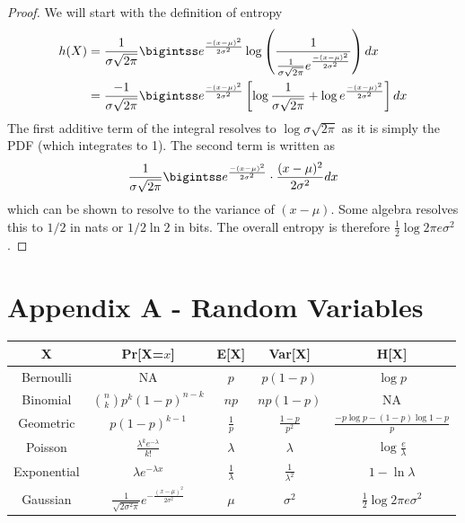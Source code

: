 \documentclass[11pt]{article}
\theoremstyle{definition}
\begin{document}
\begin{proof}
We will start with the definition of entropy 
\begin{align*}
h(X) &= \frac{1}{\sigma \sqrt{2\pi}} \bigintss e^{\frac{-(x - \mu)^2}{2 \sigma^2}} \log \left( \frac{1}{\frac{1}{\sigma \sqrt{2 \pi}} e^{\frac{-(x - \mu)^2}{2 \sigma^2}}} \right) dx \\
 &=   \frac{-1}{\sigma \sqrt{2\pi}} \bigintss e^{\frac{-(x - \mu)^2}{2 \sigma^2}} \left[ \log \frac{1}{\sigma \sqrt{2\pi}} + \log e^{\frac{-(x - \mu)^2}{2 \sigma^2}} \right] dx
\end{align*}
The first additive term of the integral resolves to $\log \sigma \sqrt{2\pi}$ as it is simply the PDF (which integrates to 1). The second term is written as
\begin{align*}
\frac{1}{\sigma \sqrt{2\pi}} \bigintss e^{\frac{-(x - \mu)^2}{2 \sigma^2}} \cdot \frac{(x-\mu)^2}{2\sigma^2} dx
\end{align*}
which can be shown to resolve to the variance of $(x-\mu)$. Some algebra resolves this to $1/2$ in nats or $1/2\ln 2$ in bits. The overall entropy is therefore $\frac{1}{2} \log 2 \pi e \sigma^2$. 
\end{proof}

\newpage
\section*{Appendix A - Random Variables}
\begin{table}[h]
\centering
\begin{tabular}{|c|c|c|c|c|}
\hline
X & Pr[X=$x$] & E[X] & Var[X] & H[X] \\
\hline
Bernoulli & NA & $p$ & $p(1-p)$ & $\log{p}$ \\
\hline
Binomial & $\binom{n}{k}p^{k}(1-p)^{n-k}$ & $np$ & $np(1-p)$ & NA \\
\hline
Geometric & $p(1 - p )^{k - 1}$ & $\frac{1}{p}$ & $\frac{1 - p}{p^2}$ & $\frac{-p\log{p} - (1-p)\log{1-p}}{p}$ \\
\hline
Poisson & $\frac{\lambda^k e^{-\lambda}}{k!}$ & $\lambda$ & $\lambda$ & $\log{\frac{e}{\lambda}}$ \\
\hline
Exponential & $\lambda e^{-\lambda x}$ & $\frac{1}{\lambda}$ & $\frac{1}{\lambda^2}$   & $1 - \ln{\lambda}$ \\
\hline
Gaussian & $\frac{1}{\sqrt{2 \sigma^2 \pi}} e^{-\frac{(x - \mu)^2}{2 \sigma^2}}$ & $\mu$ & $\sigma^2$ & $\frac{1}{2}\log{2\pi e\sigma^2}$\\
\hline
\end{tabular}
\end{table}
\end{document}
